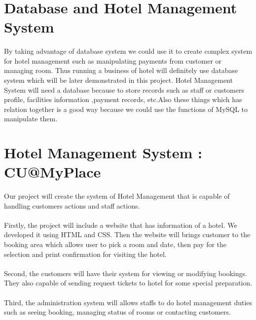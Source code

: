 \section{Database and Hotel Management System}
\paragraph{}
	By taking advantage of database system we could use it to create complex system for hotel management such as manipulating payments from customer or managing room. Thus running a business of hotel will definitely use database system which will be later demonstrated in this project. Hotel Management System will need a database because to store records such as staff or customers profile, facilities information ,payment records, etc.Also these things which has relation together is a good way because we could use the functions of MySQL to manipulate them.
\section{Hotel Management System : CU@MyPlace}
\paragraph{}
    Our project will create the system of Hotel Management that is capable of handling customers actions and staff actions.
\paragraph{}
	Firstly, the project will include a website that has information of a hotel. We developed it using HTML and CSS. Then the website will brings customer to the booking area which allows user to pick a room and date, then pay for the selection and print confirmation for visiting the hotel.
\paragraph{}
	Second, the customers will have their system for viewing or modifying bookings. They also capable of sending request tickets to hotel for some special preparation.
\paragraph{}
	Third, the administration system will allows staffs to do hotel management duties such as seeing booking, managing status of rooms or contacting customers.



